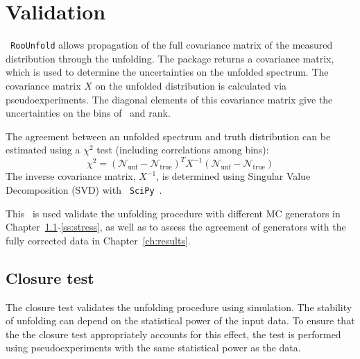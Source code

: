 \section{Validation}

\texttt{ RooUnfold} allows propagation of the full covariance matrix of the measured distribution through the unfolding. 
The package returns a covariance matrix, which is used to determine the uncertainties
on the unfolded spectrum. %
The covariance matrix $X$ on the unfolded distribution is calculated via pseudoexperiments. The diagonal elements of this covariance matrix give the uncertainties on the bins of \pt\ and rank. 


The agreement between an unfolded spectrum and truth distribution can be estimated using a $\chi^2$ test (including correlations among bins):
\begin{equation}
\chi^2= \left( {\mathscr N}_{\textrm {unf}}- {\mathscr N}_{\textrm {true}} \right)^{T} X^{-1}\left( {\mathscr N}_{\textrm {unf}}- {\mathscr N}_{\textrm {true}} \right)
\label{eq:unfchi2}
\end{equation}
 The inverse covariance matrix, $X^{-1}$, is determined using Singular Value Decomposition (SVD) with \texttt{ SciPy}~\cite{scipy}.

This \chisq\ is used validate the unfolding procedure with different MC generators in Chapter~\ref{ss:close}-\ref{ss:stress}, as well as to assess the agreement of generators with the fully corrected data in Chapter~\ref{ch:results}.
\subsection{Closure test}
\label{ss:close}
The closure test validates the unfolding procedure using simulation. The stability of unfolding can depend on the statistical power of the input data. To ensure that the the closure test appropriately accounts for this effect, the test is performed using pseudoexperiments with the same statistical power as the data.

